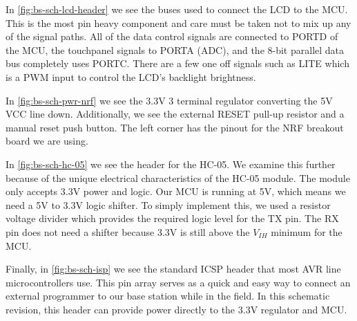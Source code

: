 
In \autoref{fig:bs-sch-lcd-header} we see the buses used to connect the LCD to the
MCU. This is the most pin heavy component and care must be taken not to mix up
any of the signal paths. All of the data control signals are connected to PORTD
of the MCU, the touchpanel signals to PORTA (ADC), and the 8-bit parallel data
bus completely uses PORTC. There are a few one off signals such as LITE which
is a PWM input to control the LCD's backlight brightness.


In \autoref{fig:bs-sch-pwr-nrf} we see the 3.3V 3 terminal regulator converting the
5V VCC line down. Additionally, we see the external RESET pull-up resistor and
a manual reset push button. The left corner has the pinout for the NRF breakout
board we are using.


In \autoref{fig:bs-sch-hc-05} we see the header for the HC-05. We examine this
further because of the unique electrical characteristics of the HC-05 module.
The module only accepts 3.3V power and logic. Our MCU is running at 5V,
which means we need a 5V to 3.3V logic shifter. To simply implement this, we
used a resistor voltage divider which provides the required logic level for
the TX pin. The RX pin does not need a shifter because 3.3V is still above the
$V_{IH}$ minimum for the MCU.


Finally, in \autoref{fig:bs-sch-isp} we see the standard ICSP header that most
AVR line microcontrollers use. This pin array serves as a quick and easy
way to connect an external programmer to our base station while in the field.
In this schematic revision, this header can provide power directly to the 3.3V
regulator and MCU.



